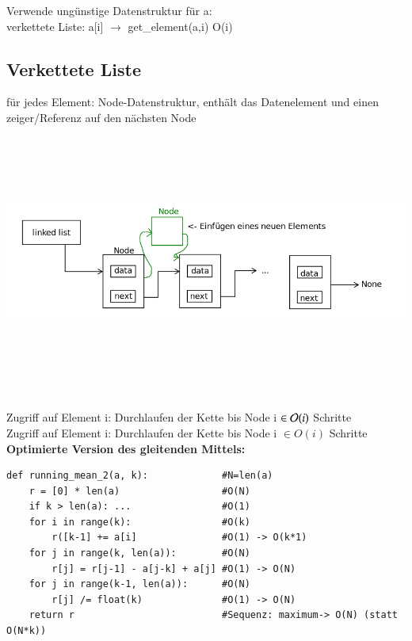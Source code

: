 Verwende ungünstige Datenstruktur für a: \\
verkettete Liste: a[i] $\rightarrow$ get\_element(a,i) \hspace*{1cm} O(i)\\

\subsection*{Verkettete Liste}
für jedes Element: Node-Datenstruktur, enthält das Datenelement und einen zeiger/Referenz auf den nächsten Node \\

\includegraphics[width=15cm,height=9cm,keepaspectratio]{./Pictures/linkedlist.png}

Zugriff auf Element i: Durchlaufen der Kette bis Node i $\in \mathcal{O}{}(i)$ Schritte \\

Zugriff auf Element i: Durchlaufen der Kette bis Node i $\in O(i)$ Schritte \\

\textbf{Optimierte Version des gleitenden Mittels:}
\begin{verbatim}
def running_mean_2(a, k):             #N=len(a)
    r = [0] * len(a)                  #O(N)
    if k > len(a): ...                #O(1)
    for i in range(k):                #O(k)
        r([k-1] += a[i]               #O(1) -> O(k*1)
    for j in range(k, len(a)):        #O(N)
        r[j] = r[j-1] - a[j-k] + a[j] #O(1) -> O(N)
    for j in range(k-1, len(a)):      #O(N)
        r[j] /= float(k)              #O(1) -> O(N)
    return r                          #Sequenz: maximum-> O(N) (statt O(N*k))
\end{verbatim}

